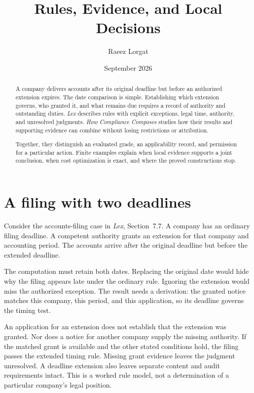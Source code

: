 \documentclass{momentum}
\title{Rules, Evidence, and Local Decisions}
\author{Raeez Lorgat}
\date{September 2026}
\begin{document}
\maketitle

\begin{abstract}
A company delivers accounts after its original deadline but before an authorized extension expires. The date comparison is simple. Establishing which extension governs, who granted it, and what remains due requires a record of authority and outstanding duties. \emph{Lex} describes rules with explicit exceptions, legal time, authority, and unresolved judgments. \emph{How Compliance Composes} studies how their results and supporting evidence can combine without losing restrictions or attribution.

Together, they distinguish an evaluated grade, an applicability record, and permission for a particular action. Finite examples explain when local evidence supports a joint conclusion, when cost optimization is exact, and where the proved constructions stop.
\end{abstract}

\section{A filing with two deadlines}

Consider the accounts-filing case in \emph{Lex}, Section~7.7. A company has an ordinary filing deadline. A competent authority grants an extension for that company and accounting period. The accounts arrive after the original deadline but before the extended deadline.

The computation must retain both dates. Replacing the original date would hide why the filing appears late under the ordinary rule. Ignoring the extension would miss the authorized exception. The result needs a derivation: the granted notice matches this company, this period, and this application, so its deadline governs the timing test.

An application for an extension does not establish that the extension was granted. Nor does a notice for another company supply the missing authority. If the matched grant is available and the other stated conditions hold, the filing passes the extended timing rule. Missing grant evidence leaves the judgment unresolved. A deadline extension also leaves separate content and audit requirements intact. This is a worked rule model, not a determination of a particular company's legal position. \cite[Section~7.7]{lex}
\end{document}
